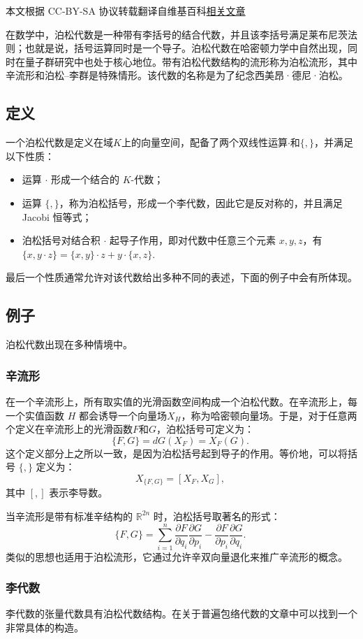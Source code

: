 
本文根据 CC-BY-SA 协议转载翻译自维基百科\href{https://en.wikipedia.org/wiki/Poisson_algebra}{相关文章}

在数学中，泊松代数是一种带有李括号的结合代数，并且该李括号满足莱布尼茨法则；也就是说，括号运算同时是一个导子。泊松代数在哈密顿力学中自然出现，同时在量子群研究中也处于核心地位。带有泊松代数结构的流形称为泊松流形，其中辛流形和泊松–李群是特殊情形。该代数的名称是为了纪念西美昂·德尼·泊松。
\subsection{定义}
一个泊松代数是定义在域$K$上的向量空间，配备了两个双线性运算$\cdot$和$\{,\}$，并满足以下性质：
\begin{itemize}
\item 运算 $\cdot$ 形成一个结合的 $K$-代数；
\item 运算 $\{,\}$，称为泊松括号，形成一个李代数，因此它是反对称的，并且满足Jacobi 恒等式；
\item 泊松括号对结合积 $\cdot$ 起导子作用，即对代数中任意三个元素 $x, y, z$，有$\{x, y \cdot z\} = \{x, y\} \cdot z + y \cdot \{x, z\}$.
\end{itemize}
最后一个性质通常允许对该代数给出多种不同的表述，下面的例子中会有所体现。
\subsection{例子}
泊松代数出现在多种情境中。
\subsubsection{辛流形}
在一个辛流形上，所有取实值的光滑函数空间构成一个泊松代数。在辛流形上，每一个实值函数 $H$ 都会诱导一个向量场$X_H$，称为哈密顿向量场。于是，对于任意两个定义在辛流形上的光滑函数$F$和$G$，泊松括号可定义为：
$$
\{F,G\} = dG(X_F) = X_F(G).~
$$
这个定义部分上之所以一致，是因为泊松括号起到导子的作用。等价地，可以将括号 $\{,\}$ 定义为：
$$
X_{\{F,G\}} = [X_F, X_G],~
$$
其中 $[,]$ 表示李导数。

当辛流形是带有标准辛结构的 $\mathbb{R}^{2n}$ 时，泊松括号取著名的形式：
$$
\{F,G\} = \sum_{i=1}^n 
\frac{\partial F}{\partial q_i}\frac{\partial G}{\partial p_i} - 
\frac{\partial F}{\partial p_i}\frac{\partial G}{\partial q_i}.~
$$
类似的思想也适用于泊松流形，它通过允许辛双向量退化来推广辛流形的概念。
\subsubsection{李代数}
李代数的张量代数具有泊松代数结构。在关于普遍包络代数的文章中可以找到一个非常具体的构造。

